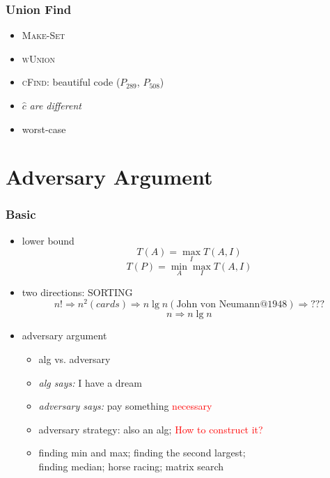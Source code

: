 \documentclass{beamer}
\begin{document}
\begin{frame}
  \frametitle{Union Find}
  
  \begin{example}
    \begin{itemize}
      \item \textsc{Make-Set}
      \item \textsc{wUnion}
      \item \textsc{cFind}: beautiful code ($P_{289}$, $P_{508}$)
      \item $\hat{c}$ \emph{are different}
      \item worst-case
    \end{itemize} 
  \end{example}
\end{frame}
\section{Adversary Argument}

\begin{frame}
  \frametitle{Basic}
  
  \begin{itemize}
    \item lower bound
      \[ T(A) = \max_{I} T(A,I) \]
      \[ T(P) = \min_{A} \max_{I} T(A,I) \]
    \item two directions: \uppercase{Sorting}
		\[ n! \Rightarrow n^2 (cards) \Rightarrow n \lg n (\textrm{John von
		Neumann}@1948) \Rightarrow ??? \] 
		\[ n \Rightarrow n \lg n \]
    \item adversary argument
      \begin{itemize}
        \setlength{\itemsep}{3pt}
        \item alg vs. adversary
        \item \emph{alg says:} I have a dream
        \item \emph{adversary says:} pay something \textcolor{red}{necessary}  
        \item adversary strategy: also an alg; \textcolor{red}{How to construct
        it?}
        \item finding min and max; finding the second largest; \\ 
        finding median; horse racing; matrix search
      \end{itemize}
  \end{itemize}
\end{frame}
\end{document}
